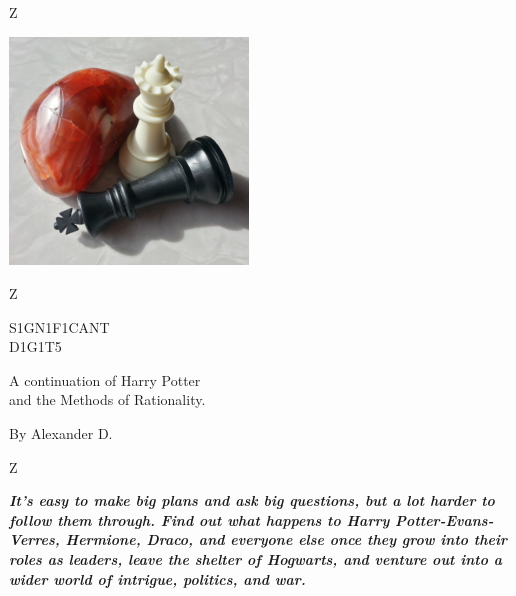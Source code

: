 \thispagestyle{empty}
\begin{center}
\leavevmode\null\LARGE\cleaders\hbox{\kding Z}\hfill\null

\medskip
\includegraphics[width=2.5in]{titlepic.png}
\medskip

\leavevmode\null\LARGE\cleaders\hbox{\kding Z}\hfill\null

\vfill

\titlepagefont\HUGE
S1GN1F1CANT\\
\fontsize{48}{48}\selectfont D1G1T5\kern-4pt\null
\vspace{18pt}

\titlefont\large

A continuation of Harry Potter\\
and the Methods of Rationality.

\vfill\vfill


\huge
By Alexander D.

\vfill

\leavevmode\null\LARGE\cleaders\hbox{\kding Z}\hfill\null
\end{center}
\clearpage
\thispagestyle{plain}

\null\vfill
\null\hfill\begin{minipage}{3in}
\bfseries\itshape\noindent It's easy to make big plans and ask big questions, but a lot harder to follow them through.  Find out what happens to Harry Potter-Evans-Verres, Hermione, Draco, and everyone else once they grow into their roles as leaders, leave the shelter of Hogwarts, and venture out into a wider world of intrigue, politics, and war.
\end{minipage}\hfill\null

\vfill\vfill\null
\clearpage

